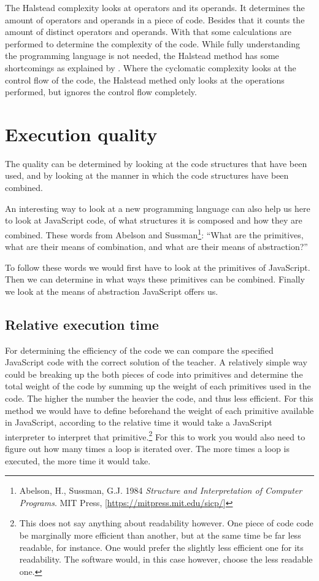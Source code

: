 \documentclass{article}
\begin{document}
The Halstead complexity looks at operators and its operands. It determines the
amount of operators and operands in a piece of code. 
Besides that it counts the
amount of distinct operators and operands. With that some calculations are
performed to determine the complexity of the code. While fully understanding
the programming language is not needed, the Halstead method has some
shortcomings as explained by \citet{yu2010survey}. Where the cyclomatic
complexity looks at the control flow of the code, the Halstead methed only
looks at the operations performed, but ignores the control flow completely.

\section{Execution quality}

The quality can be determined by looking at the code structures that have been
used, and by looking at the manner in which the code structures have been
combined.

An interesting way to look at a new programming language can also help us here
to look at JavaScript code, of what structures it is composed and how they are
combined. These words from Abelson and Sussman\footnote{Abelson, H., Sussman,
G.J. 1984 {\em Structure and Interpretation of Computer Programs}. MIT Press,
[\url{https://mitpress.mit.edu/sicp/}]}: ``What are the primitives, what are
their means of combination, and what are their means of abstraction?''

To follow these words we would first have to look at the primitives of
JavaScript. Then we can determine in what ways these primitives can be
combined. Finally we look at the means of abstraction JavaScript offers us.

\subsection{Relative execution time}

For determining the efficiency of the code we can compare the specified
JavaScript code with the correct solution of the teacher. A relatively simple
way could be breaking up the both pieces of code into primitives and determine
the total weight of the code by summing up the weight of each primitives used
in the code. The higher the number the heavier the code, and thus less
efficient. For this method we would have to define beforehand the weight of
each primitive available in JavaScript, according to the relative time it would
take a JavaScript interpreter to interpret that primitive.\footnote{This does
not say anything about readability however. One piece of code code be
marginally more efficient than another, but at the same time be far less
readable, for instance. One would prefer the slightly less efficient one for
its readability. The software would, in this case however, choose the less
readable one.} For this to work you would also need to figure out how many
times a loop is iterated over. The more times a loop is executed, the more time
it would take.
\end{document}
